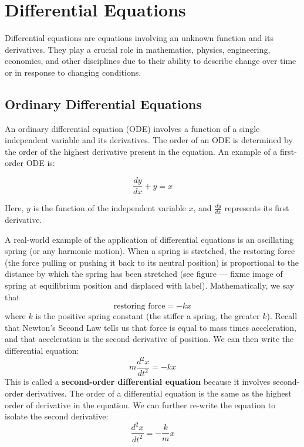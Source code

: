 \chapter{Differential Equations}

Differential equations are equations involving an unknown function and
its derivatives. They play a crucial role in mathematics, physics,
engineering, economics, and other disciplines due to their ability to
describe change over time or in response to changing conditions.

\section{Ordinary Differential Equations}

An ordinary differential equation (ODE) involves a function of a
single independent variable and its derivatives. The order of an ODE
is determined by the order of the highest derivative present in the
equation. An example of a first-order ODE is: 

\begin{equation}
\frac{dy}{dx} + y = x
\end{equation}

Here, $y$ is the function of the independent variable $x$, and 
$\frac{dy}{dx}$ represents its first derivative.

A real-world example of the application of differential equations is an 
oscillating spring (or any harmonic motion). When a spring is stretched, the 
restoring force (the force pulling or pushing it back to its neutral position) 
is proportional to the distance by which the spring has been stretched (see 
figure --- fixme image of spring at equilibrium position and displaced with 
label). Mathematically, we say that
$$\text{restoring force} = -kx$$
where $k$ is the positive spring constant (the stiffer a spring, the greater 
$k$). Recall that Newton's Second Law tells us that force is equal to mass 
times acceleration, and that acceleration is the second derivative of position. 
We can then write the differential equation:
$$m \frac{d^2x}{dt^2} = -kx$$
This is called a \textbf{second-order differential equation} because it 
involves second-order derivatives. The order of a differential equation is the 
same as the highest order of derivative in the equation. We can further 
re-write the equation to isolate the second derivative:
$$\frac{d^2x}{dt^2} = -\frac{k}{m}x$$

